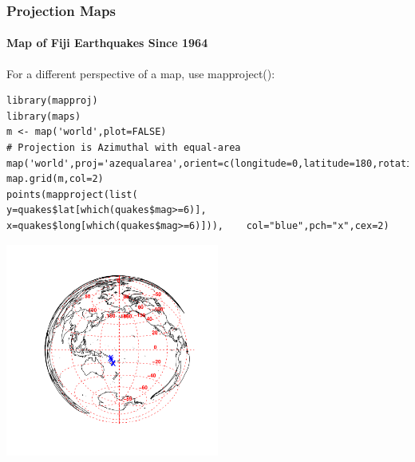 \begin{frame}
\frametitle{Projection Maps}
  \framesubtitle{Map of Fiji Earthquakes Since 1964}

For a different perspective of a map, use  \ttfamily mapproject(): \normalfont 

\begin{lstlisting}
library(mapproj)
library(maps)
m <- map('world',plot=FALSE)
# Projection is Azimuthal with equal-area
map('world',proj='azequalarea',orient=c(longitude=0,latitude=180,rotation=0))
map.grid(m,col=2)
points(mapproject(list(                       y=quakes$lat[which(quakes$mag>=6)],       x=quakes$long[which(quakes$mag>=6)])),    col="blue",pch="x",cex=2)
\end{lstlisting}

\newpage
       \begin{center}
\includegraphics[width = 70mm]{images/Fuji2.pdf}
\end{center}

\end{frame}



